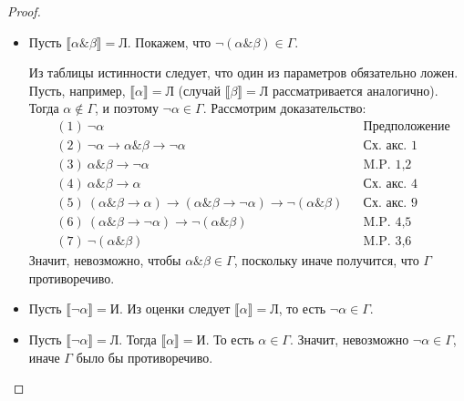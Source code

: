 \documentclass[a4paper,11pt]{article}
\theoremstyle{definition}
\newcommand{\proves}{\vdash}
\newcommand{\True}{\text{И}}
\newcommand{\False}{\text{Л}}
\newcommand{\amp}{\mathbin{\&}}
\begin{document}
\begin{proof}
\begin{itemize}
  В самом деле, пусть это не так и $\neg(\alpha \amp \beta) \in \Gamma$, а,
  значит, $\Gamma, \alpha \amp \beta \proves \psi \amp \neg\psi$. Тогда
  $\Gamma, \alpha, \beta \proves \psi \amp \neg\psi$ (доказуемое утверждение
  $(\psi \amp \varphi \to \pi) \to (\psi \to \varphi \to \pi)$ и теорема о
  дедукции).

  Из таблицы истинности конъюнкции следует, что она истинна только если обе ее
  составных части истинны. То есть $\llbracket\alpha\rrbracket = \True$ и
  $\llbracket\beta\rrbracket = \True$. Значит, $\alpha \in \Gamma$ и $\beta \in
  \Gamma$, что приводит к противоречивости $\Gamma$.
\item Пусть $\llbracket\alpha \amp \beta\rrbracket = \False$. Покажем, что
  $\neg(\alpha \amp \beta) \in \Gamma$.

  Из таблицы истинности следует, что один из параметров обязательно ложен. Пусть,
  например, $\llbracket\alpha\rrbracket = \False$ (случай
  $\llbracket\beta\rrbracket = \False$ рассматривается аналогично). Тогда
  $\alpha \notin \Gamma$, и поэтому $\neg\alpha \in \Gamma$. Рассмотрим
  доказательство:
  \begin{align*}
  &(1)\ \neg\alpha &&\text{Предположение}\\
  &(2)\ \neg\alpha \to \alpha \amp \beta \to \neg\alpha &&\text{Сх. акс. 1}\\
  &(3)\ \alpha \amp \beta \to \neg\alpha &&\text{M.P. 1,2}\\
  &(4)\ \alpha \amp \beta \to \alpha &&\text{Сх. акс. 4}\\
  &(5)\ (\alpha \amp \beta \to \alpha) \to (\alpha \amp \beta \to \neg\alpha) \to \neg(\alpha \amp \beta) &&\text{Сх. акс. 9}\\
  &(6)\ (\alpha \amp \beta \to \neg\alpha) \to \neg(\alpha \amp \beta) &&\text{M.P. 4,5}\\
  &(7)\ \neg(\alpha \amp \beta) &&\text{M.P. 3,6}
  \end{align*}
  Значит, невозможно, чтобы $\alpha \amp \beta \in \Gamma$, поскольку иначе
  получится, что $\Gamma$ противоречиво.
\item Пусть $\llbracket\neg\alpha\rrbracket = \True$. Из оценки следует
  $\llbracket\alpha\rrbracket = \False$, то есть $\neg\alpha \in \Gamma$.
\item Пусть $\llbracket\neg\alpha\rrbracket = \False$. Тогда
  $\llbracket\alpha\rrbracket = \True$. То есть $\alpha \in \Gamma$. Значит,
  невозможно $\neg\alpha \in \Gamma$, иначе $\Gamma$ было бы противоречиво.
\end{itemize}
\end{proof}
\end{document}
